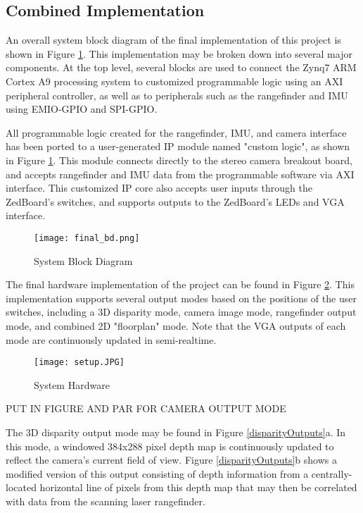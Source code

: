 \subsection{Combined Implementation}
An overall system block diagram of the final implementation of this project is shown in Figure \ref{finalBD}. This implementation may be broken down into several major components. At the top level, several blocks are used to connect the Zynq7 ARM Cortex A9 processing system to customized programmable logic using an AXI peripheral controller, as well as to peripherals such as the rangefinder and IMU using EMIO-GPIO and SPI-GPIO. 
\par
All programmable logic created for the rangefinder, IMU, and camera interface has been ported to a user-generated IP module named "custom logic", as shown in Figure \ref{finalBD}. This module connects directly to the stereo camera breakout board, and accepts rangefinder and IMU data from the programmable software via AXI interface. This customized IP core also accepts user inputs through the ZedBoard's switches, and supports outputs to the ZedBoard's LEDs and VGA interface. 
\par
\begin{figure}[!htb] 
	\centerline{
	\texttt{[image: final\_bd.png]}
	}
	\caption{System Block Diagram}
	\label{finalBD}
\end{figure}
\par
The final hardware implementation of the project can be found in Figure 
\ref{finalHW}. This implementation supports several output modes based on the positions of the user switches, including a 3D disparity mode, camera image mode, rangefinder output mode, and combined 2D "floorplan" mode. Note that the VGA outputs of each mode are continuously updated in semi-realtime. 
\begin{figure}[H]  
 	\centerline{
	\texttt{[image: setup.JPG]}
	}
	\caption{System Hardware}
	\label{finalHW}
\end{figure}
\par
PUT IN FIGURE AND PAR FOR CAMERA OUTPUT MODE
\par
The 3D disparity output mode may be found in Figure \ref{disparityOutputs}a. In this mode, a windowed 384x288 pixel depth map is continuously updated to reflect the camera's current field of view. Figure \ref{disparityOutputs}b shows a modified version of this output consisting of depth information from a centrally-located horizontal line of pixels from this depth map that may then be correlated with data from the scanning laser rangefinder. 
